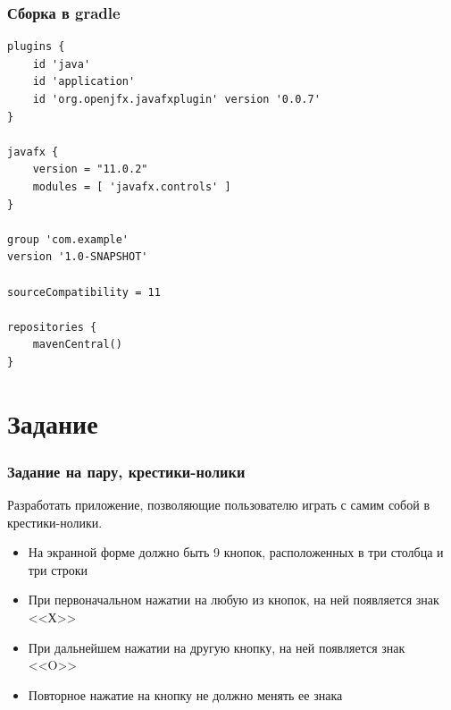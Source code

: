 \documentclass[xetex,mathserif,serif]{beamer}
\begin{document}
	\begin{frame}[fragile]
		\frametitle{Сборка в gradle}
		\begin{footnotesize}
			\begin{verbatim}
plugins {
    id 'java'
    id 'application'
    id 'org.openjfx.javafxplugin' version '0.0.7'
}

javafx {
    version = "11.0.2"
    modules = [ 'javafx.controls' ]
}

group 'com.example'
version '1.0-SNAPSHOT'

sourceCompatibility = 11

repositories {
    mavenCentral()
}
			\end{verbatim}
		\end{footnotesize}
	\end{frame}

	\section{Задание}

	\begin{frame}
		\frametitle{Задание на пару, крестики-нолики}
		Разработать приложение, позволяющие пользователю играть с самим собой в крестики-нолики. 
		\begin{itemize}
			\item На экранной форме должно быть 9 кнопок, расположенных в три столбца и три строки
			\item При первоначальном нажатии на любую из кнопок, на ней появляется знак <<Х>> 
			\item При дальнейшем нажатии на другую кнопку, на ней появляется знак <<O>>
			\item Повторное нажатие на кнопку не должно менять ее знака
		\end{itemize}
	\end{frame}
\end{document}
